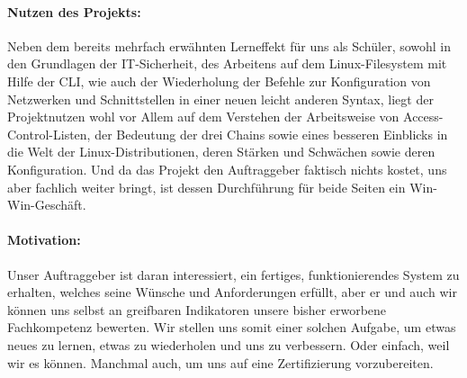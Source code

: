 \paragraph*{Nutzen des Projekts: } Neben dem bereits mehrfach erwähnten Lerneffekt für uns als Schüler, sowohl in den Grundlagen der \ac{IT}-Sicherheit, des Arbeitens auf dem Linux-Filesystem mit Hilfe der \ac{CLI}, wie auch der Wiederholung der Befehle zur Konfiguration von Netzwerken und Schnittstellen in einer neuen leicht anderen Syntax, liegt der Projektnutzen wohl vor Allem auf dem Verstehen der Arbeitsweise von Access-Control-Listen, der Bedeutung der drei Chains sowie eines besseren Einblicks in die Welt der Linux-Distributionen, deren Stärken und Schwächen sowie deren Konfiguration. Und da das Projekt den Auftraggeber faktisch nichts kostet, uns aber fachlich weiter bringt, ist dessen Durchführung für beide Seiten ein Win-Win-Geschäft.
\paragraph*{Motivation: } Unser Auftraggeber ist daran interessiert, ein fertiges, funktionierendes System zu erhalten, welches seine Wünsche und Anforderungen erfüllt, aber er und auch wir können uns selbst an greifbaren Indikatoren unsere bisher erworbene Fachkompetenz bewerten. Wir stellen uns somit einer solchen Aufgabe, um etwas neues zu lernen, etwas zu wiederholen und uns zu verbessern. Oder einfach, weil wir es können. Manchmal auch, um uns auf eine Zertifizierung vorzubereiten.

